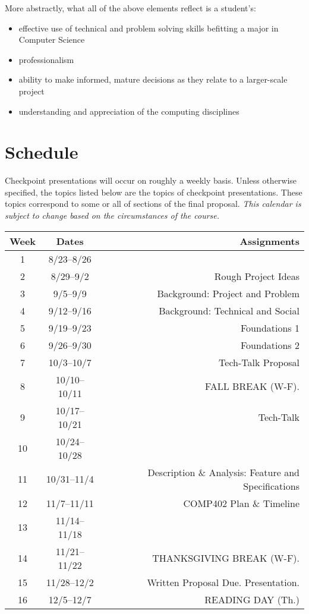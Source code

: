 \documentclass[10pt]{article}
\begin{document}
More abstractly, what all of the above elements reflect is a student's:
\begin{itemize}
\item effective use of technical and problem solving skills befitting a major in Computer Science
\item professionalism
\item ability to make informed, mature decisions as they relate to a larger-scale project
\item understanding and appreciation of the computing disciplines
\end{itemize}


\section{Schedule}

Checkpoint presentations will occur on roughly a weekly basis. Unless otherwise specified, the topics listed below are the topics of checkpoint presentations. These topics correspond to some or all of sections of the final proposal. \textit{This calendar is subject to change based on the circumstances of the course.}

\begin{center}
\begin{tabular}{ccr}
\toprule
Week & Dates & Assignments \\
\toprule
1 & 8/23--8/26 &  \\
2 & 8/29--9/2 &   Rough Project Ideas \\
3 & 9/5--9/9 &   Background: Project and Problem  \\
4 & 9/12--9/16 & Background: Technical and Social  \\
5 & 9/19--9/23 & Foundations 1  \\
6 & 9/26--9/30  &  Foundations 2 \\
7 & 10/3--10/7 &  Tech-Talk Proposal \\
8 & 10/10--10/11 & FALL BREAK (W-F). \\
9 & 10/17--10/21 &  Tech-Talk \\
10 & 10/24--10/28 &  \\
11 & 10/31--11/4 &  Description \& Analysis: Feature and Specifications \\
12 & 11/7--11/11 & COMP402 Plan \& Timeline \\
13 & 11/14--11/18 & \\
14 & 11/21--11/22 &  THANKSGIVING BREAK (W-F).  \\
15 & 11/28--12/2 &   Written Proposal Due. Presentation. \\
16 & 12/5--12/7 &  READING DAY (Th.) \\
\bottomrule
\end{tabular}
\end{center}
\end{document}
